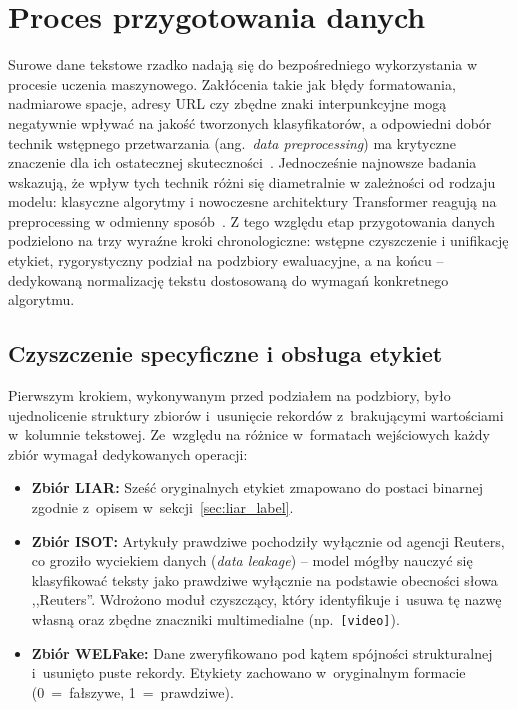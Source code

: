 \documentclass[oneside,polski,logo]{amuthesis}
\begin{document}
\section{Proces przygotowania danych}
Surowe dane tekstowe rzadko nadają się do bezpośredniego wykorzystania w procesie uczenia maszynowego. Zakłócenia takie jak błędy formatowania, nadmiarowe spacje, adresy URL czy zbędne znaki interpunkcyjne mogą negatywnie wpływać na jakość tworzonych klasyfikatorów, a odpowiedni dobór technik wstępnego przetwarzania (ang.\ \textit{data preprocessing}) ma krytyczne znaczenie dla ich ostatecznej skuteczności~\cite{AIZAWA200345}. Jednocześnie najnowsze badania wskazują, że wpływ tych technik różni się diametralnie w zależności od rodzaju modelu: klasyczne algorytmy i nowoczesne architektury Transformer reagują na preprocessing w odmienny sposób~\cite{SIINO2024102342}. Z tego względu etap przygotowania danych podzielono na trzy wyraźne kroki chronologiczne: wstępne czyszczenie i unifikację etykiet, rygorystyczny podział na podzbiory ewaluacyjne, a na końcu -- dedykowaną normalizację tekstu dostosowaną do wymagań konkretnego algorytmu.

\subsection{Czyszczenie specyficzne i obsługa etykiet}

Pierwszym krokiem, wykonywanym przed podziałem na podzbiory, było ujednolicenie struktury zbiorów i~usunięcie rekordów z~brakującymi wartościami w~kolumnie tekstowej. Ze~względu na różnice w~formatach wejściowych każdy zbiór wymagał dedykowanych operacji:
\begin{itemize}
    \item \textbf{Zbiór LIAR:} Sześć oryginalnych etykiet zmapowano do postaci binarnej zgodnie z~opisem w~sekcji~\ref{sec:liar_label}.
    \item \textbf{Zbiór ISOT:} Artykuły prawdziwe pochodziły wyłącznie od agencji Reuters, co groziło wyciekiem danych (\textit{data leakage}) -- model mógłby nauczyć się klasyfikować teksty jako prawdziwe wyłącznie na podstawie obecności słowa ,,Reuters''. Wdrożono moduł czyszczący, który identyfikuje i~usuwa tę nazwę własną oraz zbędne znaczniki multimedialne (np.\ \texttt{[video]}).
    \item \textbf{Zbiór WELFake:} Dane zweryfikowano pod kątem spójności strukturalnej i~usunięto puste rekordy. Etykiety zachowano w~oryginalnym formacie (0~=~fałszywe, 1~=~prawdziwe).
\end{itemize}
\end{document}
